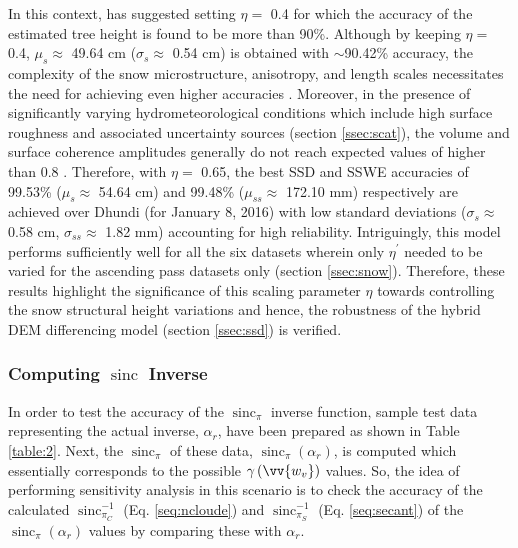 \documentclass[12pt]{elsarticle}
\numberwithin{equation}{section}
\numberwithin{figure}{section}
\numberwithin{table}{section}
\DeclareMathOperator{\sinc}{sinc}
\begin{document}
In this context, \cite{Cloude2005} has suggested setting $\eta = $ 0.4 for which the accuracy of the estimated tree height is found to be more than 90\%. Although by keeping $\eta = $ 0.4, $\mu_s \approx$ 49.64 cm ($\sigma_s \approx$ 0.54 cm) is obtained with $\sim$90.42\% accuracy, the complexity of the snow microstructure, anisotropy, and length scales necessitates the need for achieving even higher accuracies \citep{Leinss2016}. Moreover, in the presence of significantly varying hydrometeorological conditions which include high surface roughness and associated uncertainty sources (section \ref{ssec:scat}), the volume and surface coherence amplitudes generally do not reach expected values of higher than 0.8 \citep{Cloude2005, Kugler2015}. Therefore, with $\eta = $ 0.65, the best SSD and SSWE accuracies of 99.53\% ($\mu_s \approx$ 54.64 cm) and 99.48\% ($\mu_{ss} \approx$ 172.10 mm) respectively are achieved over Dhundi (for January 8, 2016) with low standard deviations ($\sigma_s \approx$ 0.58 cm, $\sigma_{ss} \approx$ 1.82 mm) accounting for high reliability. Intriguingly, this model performs sufficiently well for all the six datasets wherein only $\eta^\prime$ needed to be varied for the ascending pass datasets only (section \ref{ssec:snow}). Therefore, these results highlight the significance of this scaling parameter $\eta$ towards controlling the snow structural height variations \citep{Cloude2005, Cloude2010} and hence, the robustness of the hybrid DEM differencing model (section \ref{ssec:ssd}) is verified.

\subsubsection[Computing SINC Inverse]{Computing $\sinc$ Inverse}
\label{sssec:sinc}
In order to test the accuracy of the $\sinc_\pi$ inverse function, sample test data representing the actual inverse, $\alpha_r$, have been prepared as shown in Table \ref{table:2}. Next, the $\sinc_\pi$ of these data, $\sinc_{\pi}\left(\alpha_r\right)$, is computed which essentially corresponds to the possible $\gamma\left(\vv{w_v}\right)$ values. So, the idea of performing sensitivity analysis in this scenario is to check the accuracy of the calculated $\sinc_{\pi_C}^{-1}$ (Eq. \eqref{seq:ncloude}) and $\sinc_{\pi_S}^{-1}$ (Eq. \eqref{seq:secant}) of the $\sinc_{\pi}\left(\alpha_r\right)$ values by comparing these with $\alpha_r$.
\end{document}

